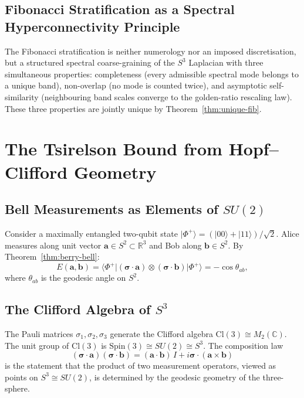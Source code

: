 \documentclass[12pt,a4paper]{article}
\theoremstyle{definition}
\theoremstyle{remark}
\begin{document}
\subsection{Fibonacci Stratification as a Spectral Hyperconnectivity Principle}

The Fibonacci stratification is neither numerology nor an imposed discretisation,
but a structured spectral coarse-graining of the $S^3$ Laplacian with three
simultaneous properties: completeness (every admissible spectral mode belongs to a
unique band), non-overlap (no mode is counted twice), and asymptotic self-similarity
(neighbouring band scales converge to the golden-ratio rescaling law). These three
properties are jointly unique by Theorem~\ref{thm:unique-fib}.

\section{The Tsirelson Bound from Hopf--Clifford Geometry}
\label{sec:tsirelson}

\subsection{Bell Measurements as Elements of $SU(2)$}

Consider a maximally entangled two-qubit state
$|\Phi^+\rangle = (|00\rangle+|11\rangle)/\sqrt{2}$. Alice measures along unit
vector $\mathbf{a}\in S^2\subset\mathbb{R}^3$ and Bob along $\mathbf{b}\in S^2$.
By Theorem~\ref{thm:berry-bell}:
\[
E(\mathbf{a},\mathbf{b}) = \langle\Phi^+|(\boldsymbol{\sigma}\cdot\mathbf{a})
\otimes(\boldsymbol{\sigma}\cdot\mathbf{b})|\Phi^+\rangle = -\cos\theta_{ab},
\]
where $\theta_{ab}$ is the geodesic angle on $S^2$.

\subsection{The Clifford Algebra of $S^3$}

The Pauli matrices $\sigma_1,\sigma_2,\sigma_3$ generate the Clifford algebra
$\mathrm{Cl}(3)\cong M_2(\mathbb{C})$. The unit group of $\mathrm{Cl}(3)$ is
$\mathrm{Spin}(3)\cong SU(2)\cong S^3$. The composition law
\[
(\boldsymbol{\sigma}\cdot\mathbf{a})(\boldsymbol{\sigma}\cdot\mathbf{b})
= (\mathbf{a}\cdot\mathbf{b})\,I + i\boldsymbol{\sigma}\cdot(\mathbf{a}\times\mathbf{b})
\]
is the statement that the product of two measurement operators, viewed as points on
$S^3 \cong SU(2)$, is determined by the geodesic geometry of the three-sphere.
\end{document}
